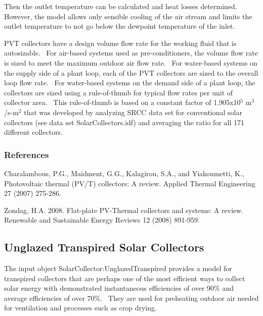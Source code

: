 Then the outlet temperature can be calculated and heat losses determined.~ However, the model allows only sensible cooling of the air stream and limits the outlet temperature to not go below the dewpoint temperature of the inlet.

PVT collectors have a design volume flow rate for the working fluid that is autosizable.~ For air-based systems used as pre-conditioners, the volume flow rate is sized to meet the maximum outdoor air flow rate.~ For water-based systems on the supply side of a plant loop, each of the PVT collectors are sized to the overall loop flow rate.~ For water-based systems on the demand side of a plant loop, the collectors are sized using a rule-of-thumb for typical flow rates per unit of collector area.~ This rule-of-thumb is based on a constant factor of 1.905x10\(^{5}\) m\(^{3}\)/s-m\(^{2}\) that was developed by analyzing SRCC data set for conventional solar collectors (see data set SolarCollectors.idf) and averaging the ratio for all 171 different collectors.

\subsubsection{References}\label{references-2-007}

Charalambous, P.G., Maidment, G.G., Kalagirou, S.A., and Yiakoumetti, K., Photovoltaic thermal (PV/T) collectors: A review. Applied Thermal Engineering 27 (2007) 275-286.

Zondag, H.A. 2008. Flat-plate PV-Thermal collectors and systems: A review.~ Renewable and Sustainable Energy Reviews 12 (2008) 891-959.

\subsection{Unglazed Transpired Solar Collectors}\label{unglazed-transpired-solar-collectors}

The input object SolarCollector:UnglazedTranspired provides a model for transpired collectors that are perhaps one of the most efficient ways to collect solar energy with demonstrated instantaneous efficiencies of over 90\% and average efficiencies of over 70\%.~ They are used for preheating outdoor air needed for ventilation and processes such as crop drying.

